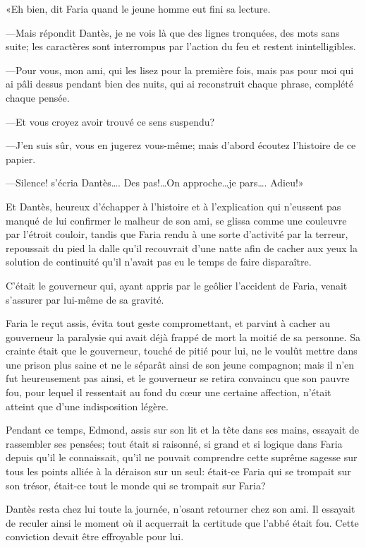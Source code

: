 «Eh bien, dit Faria quand le jeune homme eut fini sa lecture.

—Mais répondit Dantès, je ne vois là que des lignes tronquées, des mots sans suite; les caractères sont interrompus par l'action du feu et restent inintelligibles.

—Pour vous, mon ami, qui les lisez pour la première fois, mais pas pour moi qui ai pâli dessus pendant bien des nuits, qui ai reconstruit chaque phrase, complété chaque pensée.

—Et vous croyez avoir trouvé ce sens suspendu?

—J'en suis sûr, vous en jugerez vous-même; mais d'abord écoutez l'histoire de ce papier.

—Silence! s'écria Dantès\dots. Des pas!\dots On approche\dots je pars\dots. Adieu!»

Et Dantès, heureux d'échapper à l'histoire et à l'explication qui n'eussent pas manqué de lui confirmer le malheur de son ami, se glissa comme une couleuvre par l'étroit couloir, tandis que Faria rendu à une sorte d'activité par la terreur, repoussait du pied la dalle qu'il recouvrait d'une natte afin de cacher aux yeux la solution de continuité qu'il n'avait pas eu le temps de faire disparaître.

C'était le gouverneur qui, ayant appris par le geôlier l'accident de Faria, venait s'assurer par lui-même de sa gravité.

Faria le reçut assis, évita tout geste compromettant, et parvint à cacher au gouverneur la paralysie qui avait déjà frappé de mort la moitié de sa personne. Sa crainte était que le gouverneur, touché de pitié pour lui, ne le voulût mettre dans une prison plus saine et ne le séparât ainsi de son jeune compagnon; mais il n'en fut heureusement pas ainsi, et le gouverneur se retira convaincu que son pauvre fou, pour lequel il ressentait au fond du cœur une certaine affection, n'était atteint que d'une indisposition légère.

Pendant ce temps, Edmond, assis sur son lit et la tête dans ses mains, essayait de rassembler ses pensées; tout était si raisonné, si grand et si logique dans Faria depuis qu'il le connaissait, qu'il ne pouvait comprendre cette suprême sagesse sur tous les points alliée à la déraison sur un seul: était-ce Faria qui se trompait sur son trésor, était-ce tout le monde qui se trompait sur Faria?

Dantès resta chez lui toute la journée, n'osant retourner chez son ami. Il essayait de reculer ainsi le moment où il acquerrait la certitude que l'abbé était fou. Cette conviction devait être effroyable pour lui.

